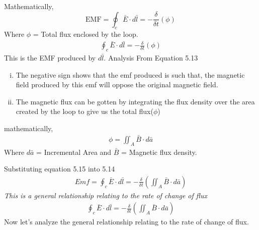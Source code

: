 Mathematically,
\begin{dmath}
\text{EMF} = \oint_c\bar{E} \cdot d\bar{l} = -\frac{\delta}{\delta t}(\phi)
\end{dmath}
Where $\phi$ = Total flux enclosed by the loop.
\begin{align}
\boxed{\oint_c\bar{E} \cdot d\bar{l} = -\frac{\delta}{\delta t}(\phi)}
\end{align}
This is the EMF produced by\emph{ $d\bar{l}$}. Analysis From Equation 5.13
\begin{enumerate}[(i)]
\item The negative sign shows that the emf produced is such that, the magnetic field produced by this emf will oppose the original magnetic field. 
\item The magnetic flux can be gotten by integrating the flux density over the area created by the loop to give us the total flux($\phi$) 
\end{enumerate}
mathematically,
\begin{align}
\phi = \iint_A\bar{B} \cdot d\bar{a}
\end{align}
Where $d\bar{a}$ = Incremental Area and $\bar{B}$ = Magnetic flux density.

Substituting equation 5.15 into 5.14 
\begin{align*}
\boxed{Emf = \oint_c\bar{E}\cdot d\bar{l} = -\frac{\delta}{\delta t} (\iint_A\bar{B}\cdot d\bar{a})}
\end{align*}
\emph{This is a general relationship relating to the rate of change of flux}	
\begin{align}
\boxed{\oint_c\bar{E}\cdot d\bar{l} = -\frac{\delta}{\delta t} (\iint_A\bar{B}\cdot d\bar{a})}
\end{align} 
Now let's analyze the general relationship relating to the rate of change of flux.

